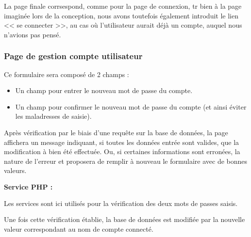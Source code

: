         \newpage
            \begin{paragraphe}
                La page finale corrsespond, comme pour la page de connexion, tr bien à la page imaginée lors de la conception, nous avons toutefois également introduit
                 le lien << se connecter >>, au cas où l'utilisateur aurait déjà un compte, auquel nous n'avions pas pensé.
            \end{paragraphe}


    \clearpage

		\subsubsection{Page de gestion compte utilisateur}

			\begin{paragraphe}
				Ce formulaire sera composé de 2 champs :
				\begin{itemize}
					\item Un champ pour entrer le nouveau mot de passe du compte.
					\item Un champ pour confirmer le nouveau mot de passe du compte (et ainsi éviter les maladresses de saisie).
				\end{itemize}
			\end{paragraphe}

			\begin{paragraphe}
				Après vérification par le biais d'une requête sur la base de données, la page affichera un message indiquant, si toutes les données entrée sont valides, que la modification à bien été effectuée. Ou, si certaines informations sont erronées, la nature de l'erreur et proposera de remplir à nouveau le formulaire avec de bonnes valeurs.
			\end{paragraphe}

			\begin{paragraphe}
				\textbf{Service PHP :}
			\end{paragraphe}

			\begin{paragraphe}
				Les services sont ici utilisés pour la vérification des deux mots de passes saisis.\par
				Une fois cette vérification établie, la base de données est modifiée par la nouvelle valeur correspondant au nom de compte connecté.
			\end{paragraphe}

